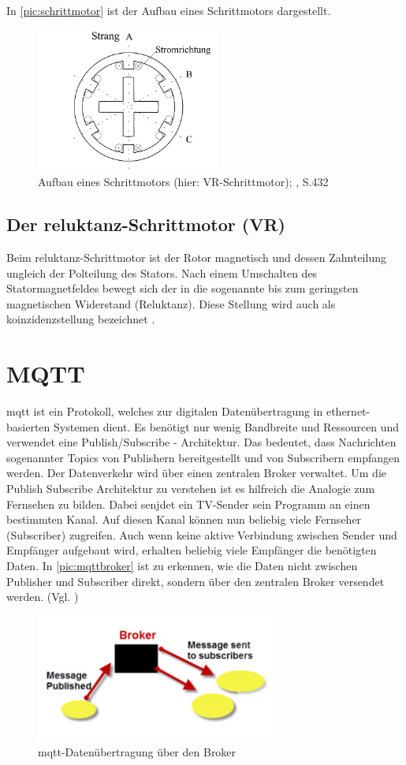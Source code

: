 \newpage
In \autoref{pic:schrittmotor} ist der Aufbau eines Schrittmotors dargestellt. 
\begin{figure}[h]
	\begin{center}
		\includegraphics[width=6cm]{schrittmotor.png}
		\caption{Aufbau eines Schrittmotors (hier: VR-Schrittmotor); \cite{kleinantriebe}, S.432}
		\label{pic:schrittmotor}
	\end{center}
\end{figure}

\subsection{Der \acrshort{reluktanz}-Schrittmotor (VR)}

Beim \acrshort{reluktanz}-Schrittmotor ist der Rotor magnetisch und dessen Zahnteilung ungleich der Polteilung des Stators. Nach einem Umschalten des Statormagnetfeldes bewegt sich der in die sogenannte bis zum geringsten magnetischen Widerstand (Reluktanz). Diese Stellung wird auch als \acrshort{koinzidenzstellung} bezeichnet . 


\section{MQTT} %
\acrshort{mqtt} ist ein Protokoll, welches zur digitalen Datenübertragung in ethernet-basierten Systemen dient. Es benötigt nur wenig Bandbreite und Ressourcen und verwendet eine 
Publish/Subscribe - Architektur. Das bedeutet, dass Nachrichten sogenannter Topics von Publishern bereitgestellt und von Subscribern empfangen werden. Der Datenverkehr wird über einen 
zentralen Broker verwaltet. Um die Publish Subscribe Architektur zu verstehen ist es hilfreich die Analogie zum Fernsehen zu bilden. Dabei senjdet ein TV-Sender sein Programm an einen bestimmten Kanal.
Auf diesen Kanal können nun beliebig viele Fernseher (Subscriber) zugreifen. Auch wenn keine aktive Verbindung zwischen Sender und Empfänger aufgebaut wird, erhalten beliebig viele Empfänger die benötigten Daten.
In \autoref{pic:mqttbroker} ist zu erkennen, wie die Daten nicht zwischen Publisher und Subscriber direkt, sondern über den zentralen Broker versendet werden. (Vgl. \cite{mqtt})

\begin{figure}[h]
    \begin{center}
        \includegraphics[width=8cm]{mqttbroker.png}
        \caption{\acrshort{mqtt}-Datenübertragung über den Broker}
        \label{pic:mqttbroker}
    \end{center}
\end{figure}